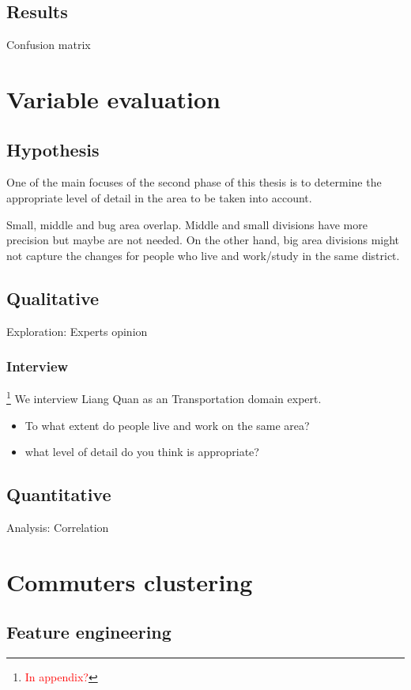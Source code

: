 \documentclass{article}
\newcommand{\selfnote}[1]{\footnote{\textcolor{red}{#1}}}
\begin{document}
\subsection{Results}
Confusion matrix


\newpage
\section{Variable evaluation}
\label{sec:partII}
\subsection{Hypothesis}
One of the main focuses of the second phase of this thesis is to determine the appropriate level of detail in the area to be taken into account. 

Small, middle and bug area overlap. Middle and small divisions have more precision but maybe are not needed. On the other hand, big area divisions might not capture the changes for people who live and work/study in the same district. 

\subsection{Qualitative}
Exploration: Experts opinion

\subsubsection{Interview}
\selfnote{In appendix?}
We interview Liang Quan as an Transportation domain expert. 

\begin{itemize}
\item To what extent do people live and work on the same area?
\item what level of detail do you think is appropriate?
\end{itemize}

\subsection{Quantitative}
Analysis: Correlation


\newpage
\section{Commuters clustering}
\label{sec:partIII}
\subsection{Feature engineering}
\end{document}
